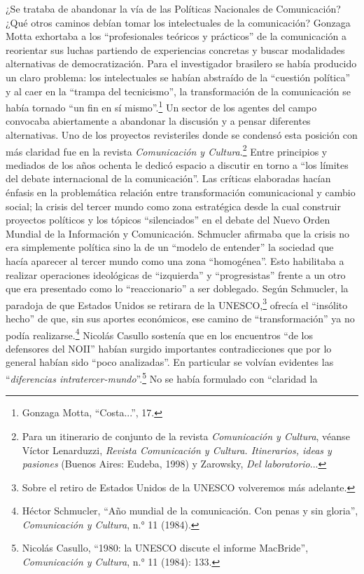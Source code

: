 \documentclass{tufte-handout}
\begin{document}
¿Se trataba de abandonar la vía de las Políticas Nacionales de
Comunicación? ¿Qué otros caminos debían tomar los intelectuales de la
comunicación? Gonzaga Motta exhortaba a los ``profesionales teóricos y
prácticos'' de la comunicación a reorientar sus luchas partiendo de
experiencias concretas y buscar modalidades alternativas de
democratización. Para el investigador brasilero se había producido un
claro problema: los intelectuales se habían abstraído de la ``cuestión
política'' y al caer en la ``trampa del tecnicismo'', la transformación
de la comunicación se había tornado ``un fin en sí mismo''.\footnote{Gonzaga
  Motta, ``Costa...'', 17.} Un sector de los agentes del campo convocaba
abiertamente a abandonar la discusión y a pensar diferentes
alternativas. Uno de los proyectos revisteriles donde se condensó esta
posición con más claridad fue en la revista \emph{Comunicación y
Cultura}.\footnote{Para un itinerario de conjunto de la revista
  \emph{Comunicación y Cultura}, véanse Víctor Lenarduzzi, \emph{Revista
  Comunicación y Cultura. Itinerarios, ideas y pasiones} (Buenos Aires:
  Eudeba, 1998) y Zarowsky, \emph{Del laboratorio}...} Entre principios
y mediados de los años ochenta le dedicó espacio a discutir en torno a
``los límites del debate internacional de la comunicación''. Las
críticas elaboradas hacían énfasis en la problemática relación entre
transformación comunicacional y cambio social; la crisis del tercer
mundo como zona estratégica desde la cual construir proyectos políticos
y los tópicos ``silenciados'' en el debate del Nuevo Orden Mundial de la
Información y Comunicación. Schmucler afirmaba que la crisis no era
simplemente política sino la de un ``modelo de entender'' la sociedad
que hacía aparecer al tercer mundo como una zona ``homogénea''. Esto
habilitaba a realizar operaciones ideológicas de ``izquierda'' y
``progresistas'' frente a un otro que era presentado como lo
``reaccionario'' a ser doblegado. Según Schmucler, la paradoja de que
Estados Unidos se retirara de la UNESCO,\footnote{Sobre el retiro de
  Estados Unidos de la UNESCO volveremos más adelante.} ofrecía el
``insólito hecho'' de que, sin sus aportes económicos, ese camino de
``transformación'' ya no podía realizarse.\footnote{Héctor Schmucler,
  ``Año mundial de la comunicación. Con penas y sin gloria'',
  \emph{Comunicación y Cultura}, n.° 11 (1984).} Nicolás Casullo
sostenía que en los encuentros ``de los defensores del NOII'' habían
surgido importantes contradicciones que por lo general habían sido
``poco analizadas''. En particular se volvían evidentes las
``\emph{diferencias intratercer-mundo}''.\footnote{Nicolás Casullo,
  ``1980: la UNESCO discute el informe MacBride'', \emph{Comunicación y
  Cultura}, n.° 11 (1984): 133.} No se había formulado con ``claridad la
\end{document}

